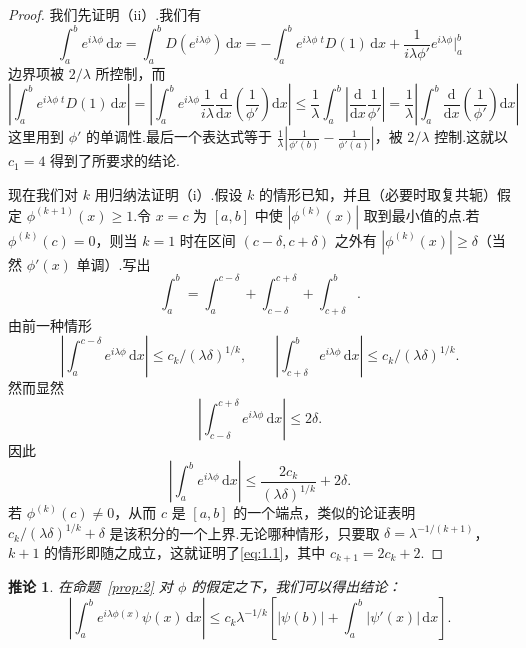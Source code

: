 \documentclass[
  BookTitleCN={傅里叶分析中的振动积分},
  BookTitleEN={Oscillatory Integrals in Fourier Analysis},
  OriginalAuthor={E.~M. Stein},
  OriginalEdition={Proc. Sympos. Pure Math. 35, Part~1},
  OriginalPublisher={American Mathematical Society},
  OriginalYear={1979},
  Translator={翻译及重排},
  ModelUsed={Codex CLI},
  Biblatex=false,
  TranslationDate={2026年8月27日}
]{mathtranslation}
\numberwithin{equation}{chapter}   %
\newtheorem*{corollary*}{推论}
\begin{document}
\begin{proof}
  我们先证明（ii）.我们有
  \[
    \int_{a}^{b}e^{i\lambda\phi}\,\mathrm{d}x = \int_{a}^{b}D(e^{i\lambda\phi})\,\mathrm{d}x = -\int_{a}^{b}e^{i\lambda\phi}\,{}^{t}\!D(1)\,\mathrm{d}x + \frac{1}{i\lambda\phi'}e^{i\lambda\phi}\Bigg|_{a}^{b}
  \]
  边界项被 $2/\lambda$ 所控制，而
  \[
    \left|\int_{a}^{b}e^{i\lambda\phi}\,{}^{t}\!D(1)\,\mathrm{d}x\right| = \left|\int_{a}^{b}e^{i\lambda\phi}\frac{1}{i\lambda}\frac{\mathrm{d}}{\mathrm{d}x}\left(\frac{1}{\phi'}\right)\mathrm{d}x\right| \leq \frac{1}{\lambda}\int_{a}^{b}\left|\frac{\mathrm{d}}{\mathrm{d}x}\frac{1}{\phi'}\right| = \frac{1}{\lambda}\left|\int_{a}^{b}\frac{\mathrm{d}}{\mathrm{d}x}\left(\frac{1}{\phi'}\right)\mathrm{d}x\right|
  \]
  这里用到 $\phi'$ 的单调性.最后一个表达式等于 $\frac{1}{\lambda}\left|\frac{1}{\phi'(b)}-\frac{1}{\phi'(a)}\right|$，被 $2/\lambda$ 控制.这就以 $c_1=4$ 得到了所要求的结论.

  现在我们对 $k$ 用归纳法证明（i）.假设 $k$ 的情形已知，并且（必要时取复共轭）假定 $\phi^{(k+1)}(x)\geq1$.令 $x=c$ 为 $[a,b]$ 中使 $|\phi^{(k)}(x)|$ 取到最小值的点.若 $\phi^{(k)}(c)=0$，则当 $k=1$ 时在区间 $(c-\delta,c+\delta)$ 之外有 $|\phi^{(k)}(x)|\geq\delta$（当然 $\phi'(x)$ 单调）.写出
  \[
    \int_{a}^{b} = \int_{a}^{c-\delta} + \int_{c-\delta}^{c+\delta} + \int_{c+\delta}^{b} .
  \]
  由前一种情形
  \[
    \left|\int_{a}^{c-\delta}e^{i\lambda\phi}\,\mathrm{d}x\right|\leq c_{k}/(\lambda\delta)^{1/k}, \qquad \left|\int_{c+\delta}^{b}e^{i\lambda\phi}\,\mathrm{d}x\right|\leq c_{k}/(\lambda\delta)^{1/k} .
  \]
  然而显然
  \[
    \left|\int_{c-\delta}^{c+\delta}e^{i\lambda\phi}\,\mathrm{d}x\right|\leq 2\delta .
  \]
  因此
  \[
    \left|\int_{a}^{b}e^{i\lambda\phi}\,\mathrm{d}x\right|\leq \frac{2c_{k}}{(\lambda\delta)^{1/k}} + 2\delta .
  \]
  若 $\phi^{(k)}(c)\neq0$，从而 $c$ 是 $[a,b]$ 的一个端点，类似的论证表明 $c_{k}/(\lambda\delta)^{1/k}+\delta$ 是该积分的一个上界.无论哪种情形，只要取 $\delta=\lambda^{-1/(k+1)}$，$k+1$ 的情形即随之成立，这就证明了\eqref{eq:1.1}，其中 $c_{k+1}=2c_{k}+2$.
\end{proof}

\begin{corollary*}\label{cor:1}
  在命题~\ref{prop:2} 对 $\phi$ 的假定之下，我们可以得出结论：
  \begin{equation}
    \left|\int_{a}^{b}e^{i\lambda\phi(x)}\psi(x)\,\mathrm{d}x\right|\leq c_{k}\lambda^{-1/k}\left[|\psi(b)| + \int_{a}^{b}|\psi'(x)|\,\mathrm{d}x\right]. \label{eq:1.2}
  \end{equation}
\end{corollary*}
\end{document}
